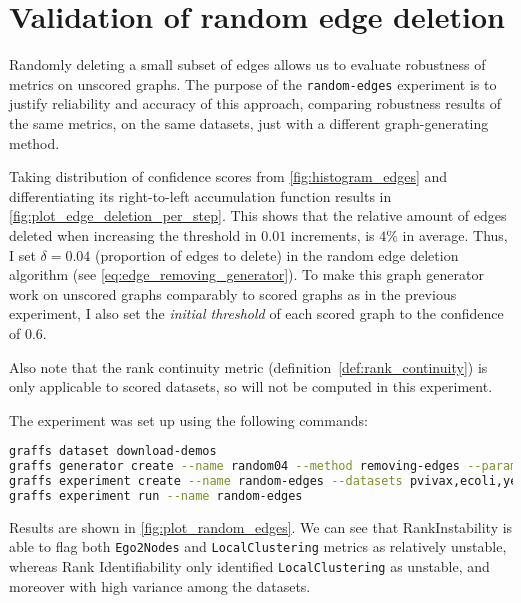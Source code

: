 \section{Validation of random edge deletion}



Randomly deleting a small subset of edges allows us to evaluate robustness of metrics on unscored graphs.
The purpose of the \texttt{random-edges} experiment is to justify reliability and accuracy of this approach, comparing robustness results of the same metrics, on the same datasets, just with a different graph-generating method.

Taking distribution of confidence scores from \autoref{fig:histogram_edges} and differentiating its right-to-left accumulation function results in \autoref{fig:plot_edge_deletion_per_step}.
This shows that the relative amount of edges deleted when increasing the threshold in $0.01$ increments, is $4\%$ in average.
Thus, I set $\delta=0.04$ (proportion of edges to delete) in the random edge deletion algorithm (see \autoref{eq:edge_removing_generator}).
To make this graph generator work on unscored graphs comparably to scored graphs as in the previous experiment, I also set the \textsl{initial threshold} of each scored graph to the confidence of $0.6$.

Also note that the rank continuity metric (definition~\ref{def:rank_continuity}) is only applicable to scored datasets, so will not be computed in this experiment.

The experiment was set up using the following commands:
\begin{lstlisting}[language=bash]
graffs dataset download-demos
graffs generator create --name random04 --method removing-edges --params 0.04,600 -n 31 --seed 7
graffs experiment create --name random-edges --datasets pvivax,ecoli,yeast --generator random04 --metrics Betweenness,Degree,Ego1Edges,Ego2Nodes,LocalClustering,PageRank,Redundancy --robustnessMeasures RankIdentifiability,RankInstability
graffs experiment run --name random-edges
\end{lstlisting}



Results are shown in \autoref{fig:plot_random_edges}.
We can see that RankInstability is able to flag both \texttt{Ego2Nodes} and \texttt{LocalClustering} metrics as relatively unstable, whereas Rank Identifiability only identified \texttt{LocalClustering} as unstable, and moreover with high variance among the datasets.


